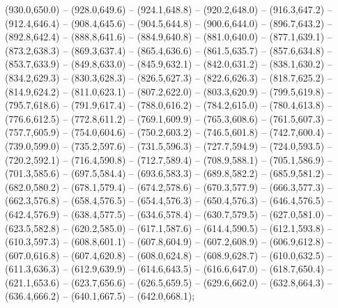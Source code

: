  (930.0,650.0) -- (928.0,649.6) -- (924.1,648.8) -- (920.2,648.0) -- (916.3,647.2) -- (912.4,646.4) -- (908.4,645.6) -- (904.5,644.8) -- (900.6,644.0) -- (896.7,643.2) -- (892.8,642.4) -- (888.8,641.6) -- (884.9,640.8) -- (881.0,640.0) -- (877.1,639.1) -- (873.2,638.3) -- (869.3,637.4) -- (865.4,636.6) -- (861.5,635.7) -- (857.6,634.8) -- (853.7,633.9) -- (849.8,633.0) -- (845.9,632.1) -- (842.0,631.2) -- (838.1,630.2) -- (834.2,629.3) -- (830.3,628.3) -- (826.5,627.3) -- (822.6,626.3) -- (818.7,625.2) -- (814.9,624.2) -- (811.0,623.1) -- (807.2,622.0) -- (803.3,620.9) -- (799.5,619.8) -- (795.7,618.6) -- (791.9,617.4) -- (788.0,616.2) -- (784.2,615.0) -- (780.4,613.8) -- (776.6,612.5) -- (772.8,611.2) -- (769.1,609.9) -- (765.3,608.6) -- (761.5,607.3) -- (757.7,605.9) -- (754.0,604.6) -- (750.2,603.2) -- (746.5,601.8) -- (742.7,600.4) -- (739.0,599.0) -- (735.2,597.6) -- (731.5,596.3) -- (727.7,594.9) -- (724.0,593.5) -- (720.2,592.1) -- (716.4,590.8) -- (712.7,589.4) -- (708.9,588.1) -- (705.1,586.9) -- (701.3,585.6) -- (697.5,584.4) -- (693.6,583.3) -- (689.8,582.2) -- (685.9,581.2) -- (682.0,580.2) -- (678.1,579.4) -- (674.2,578.6) -- (670.3,577.9) -- (666.3,577.3) -- (662.3,576.8) -- (658.4,576.5) -- (654.4,576.3) -- (650.4,576.3) -- (646.4,576.5) -- (642.4,576.9) -- (638.4,577.5) -- (634.6,578.4) -- (630.7,579.5) -- (627.0,581.0) -- (623.5,582.8) -- (620.2,585.0) -- (617.1,587.6) -- (614.4,590.5) -- (612.1,593.8) -- (610.3,597.3) -- (608.8,601.1) -- (607.8,604.9) -- (607.2,608.9) -- (606.9,612.8) -- (607.0,616.8) -- (607.4,620.8) -- (608.0,624.8) -- (608.9,628.7) -- (610.0,632.5) -- (611.3,636.3) -- (612.9,639.9) -- (614.6,643.5) -- (616.6,647.0) -- (618.7,650.4) -- (621.1,653.6) -- (623.7,656.6) -- (626.5,659.5) -- (629.6,662.0) -- (632.8,664.3) -- (636.4,666.2) -- (640.1,667.5) -- (642.0,668.1);
